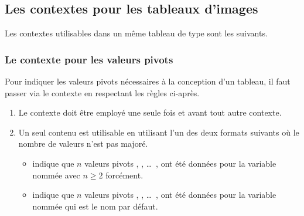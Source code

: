 \documentclass[10pt, a4paper]{article}
\begin{document}

\subsection{Les contextes pour les tableaux d'images}

Les contextes utilisables dans un même tableau de type  sont les suivants.

\medskip

\begin{itemize*}[before = \leavevmode\kern15pt, itemjoin = \kern15pt]
	\item {}

	\item {}
\end{itemize*}




\subsubsection{Le contexte  pour les valeurs pivots}
\label{tns-math-functab-ctxt-bounds}

Pour indiquer les valeurs pivots nécessaires à la conception d'un tableau, il faut passer via le contexte  en respectant les règles ci-après.
%
\begin{enumerate}
    \item Le contexte  doit être employé une seule fois et avant tout autre contexte.


    \item Un seul contenu est utilisable en utilisant l'un des deux formats suivants où le nombre de valeurs n'est pas majoré.
    \begin{itemize}
        \item {} indique que $n$ valeurs pivots  ,  , \dots\ ,  ont été données pour la variable nommée  avec $n \geq 2$ forcément.

        \item {} indique que $n$ valeurs pivots  ,  , \dots\ ,  ont été données pour la variable nommée  qui est le nom par défaut.
    \end{itemize}
\end{enumerate}
\end{document}
